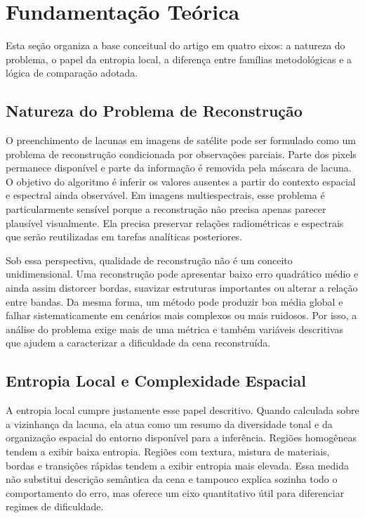 \section{Fundamentação Teórica}
\label{sec:background}

Esta seção organiza a base conceitual do artigo em quatro eixos: a natureza do problema, o papel da entropia local, a diferença entre famílias metodológicas e a lógica de comparação adotada.

\subsection{Natureza do Problema de Reconstrução}

O preenchimento de lacunas em imagens de satélite pode ser formulado como um problema de reconstrução condicionada por observações parciais.
Parte dos pixels permanece disponível e parte da informação é removida pela máscara de lacuna.
O objetivo do algoritmo é inferir os valores ausentes a partir do contexto espacial e espectral ainda observável.
Em imagens multiespectrais, esse problema é particularmente sensível porque a reconstrução não precisa apenas parecer plausível visualmente.
Ela precisa preservar relações radiométricas e espectrais que serão reutilizadas em tarefas analíticas posteriores.

Sob essa perspectiva, qualidade de reconstrução não é um conceito unidimensional.
Uma reconstrução pode apresentar baixo erro quadrático médio e ainda assim distorcer bordas, suavizar estruturas importantes ou alterar a relação entre bandas.
Da mesma forma, um método pode produzir boa média global e falhar sistematicamente em cenários mais complexos ou mais ruidosos.
Por isso, a análise do problema exige mais de uma métrica e também variáveis descritivas que ajudem a caracterizar a dificuldade da cena reconstruída.

\subsection{Entropia Local e Complexidade Espacial}

A entropia local cumpre justamente esse papel descritivo.
Quando calculada sobre a vizinhança da lacuna, ela atua como um resumo da diversidade tonal e da organização espacial do entorno disponível para a inferência.
Regiões homogêneas tendem a exibir baixa entropia.
Regiões com textura, mistura de materiais, bordas e transições rápidas tendem a exibir entropia mais elevada.
Essa medida não substitui descrição semântica da cena e tampouco explica sozinha todo o comportamento do erro, mas oferece um eixo quantitativo útil para diferenciar regimes de dificuldade.

